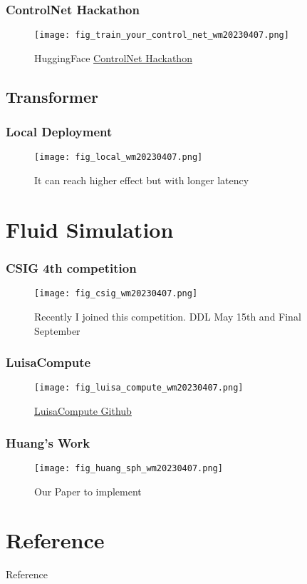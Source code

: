 \documentclass[10pt, hyperref={colorlinks=true,linkcolor=blue},xcolor=dvipsnames]{beamer}
\begin{document}
\begin{frame}
    \frametitle{ControlNet Hackathon}
    \begin{figure}
        \texttt{[image: fig\_train\_your\_control\_net\_wm20230407.png]}
        \caption[short]{HuggingFace \href{https://mp.weixin.qq.com/s/6p2jwa9E6VYHBN38HlPRXQ}{ControlNet Hackathon}}
    \end{figure}
\end{frame}

\subsection{Transformer}



\begin{frame}
    \frametitle{Local Deployment}
    \begin{figure}
        \texttt{[image: fig\_local\_wm20230407.png]}
        \caption[short]{It can reach higher effect but with longer latency}
    \end{figure}
\end{frame}


\section{Fluid Simulation}

\begin{frame}
    \frametitle{CSIG 4th competition}
    \begin{figure}
        \texttt{[image: fig\_csig\_wm20230407.png]}
        \caption[short]{Recently I joined this competition. DDL May 15th and Final September}
    \end{figure}
\end{frame}



\begin{frame}
    \frametitle{LuisaCompute}
    \begin{figure}
        \texttt{[image: fig\_luisa\_compute\_wm20230407.png]}
        \caption[short]{\href{https://github.com/LuisaGroup/LuisaCompute}{LuisaCompute Github\cite{zhengLuisaRenderHighPerformanceRendering2022}}}
    \end{figure}
\end{frame}

\begin{frame}
    \frametitle{Huang's Work}
    \begin{figure}
        \texttt{[image: fig\_huang\_sph\_wm20230407.png]}
        \caption[short]{Our Paper to implement\cite{huangGeneralNovelParallel2019}}
    \end{figure}
\end{frame}

\section{Reference}

\begin{frame}[allowframebreaks]{Reference}
    
    
\end{frame}
\end{document}
